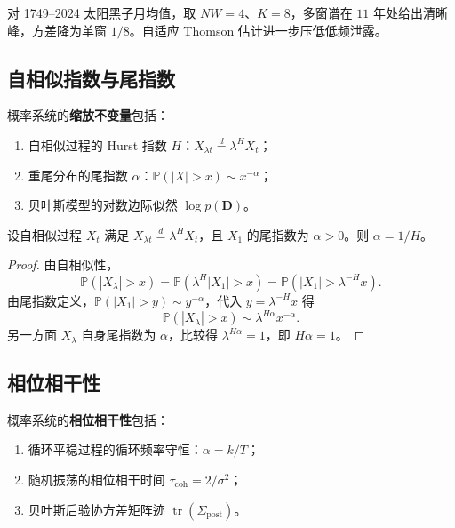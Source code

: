 \begin{example}[太阳黑子多窗谱]\label{ex:sunspot_multitaper}
对 1749--2024 太阳黑子月均值，取 $NW=4$、$K=8$，多窗谱在 $11$ 年处给出清晰峰，方差降为单窗 $1/8$。自适应 Thomson 估计进一步压低低频泄露。
\end{example}

\subsection{自相似指数与尾指数}

\begin{definition}[自相似指数与尾指数]\label{def:probability_scaling_charge}
概率系统的\textbf{缩放不变量}包括：
\begin{enumerate}[label=(\roman*)]
    \item 自相似过程的 Hurst 指数 $H$：$X_{\lambda t}\stackrel{d}{=}\lambda^H X_t$；
    \item 重尾分布的尾指数 $\alpha$：$\mathbb P(|X|>x)\sim x^{-\alpha}$；
    \item 贝叶斯模型的对数边际似然 $\log p(\mathbf D)$。
\end{enumerate}
\end{definition}

\begin{proposition}\label{prop:hurst_tail_duality}
设自相似过程 $X_t$ 满足 $X_{\lambda t}\stackrel{d}{=}\lambda^H X_t$，且 $X_1$ 的尾指数为 $\alpha>0$。则 $\alpha=1/H$。
\end{proposition}

\begin{proof}
由自相似性，
\[
\mathbb P(|X_\lambda|>x)=\mathbb P(\lambda^H|X_1|>x)=\mathbb P(|X_1|>\lambda^{-H}x).
\]
由尾指数定义，$\mathbb P(|X_1|>y)\sim y^{-\alpha}$，代入 $y=\lambda^{-H}x$ 得
\[
\mathbb P(|X_\lambda|>x)\sim \lambda^{H\alpha}x^{-\alpha}.
\]
另一方面 $X_\lambda$ 自身尾指数为 $\alpha$，比较得 $\lambda^{H\alpha}=1$，即 $H\alpha=1$。
\end{proof}

\subsection{相位相干性}

\begin{definition}[相位相干性]\label{def:probability_angular_momentum}
概率系统的\textbf{相位相干性}包括：
\begin{enumerate}[label=(\roman*)]
    \item 循环平稳过程的循环频率守恒：$\alpha=k/T$；
    \item 随机振荡的相位相干时间 $\tau_{\mathrm{coh}}=2/\sigma^2$；
    \item 贝叶斯后验协方差矩阵迹 $\operatorname{tr}(\Sigma_{\mathrm{post}})$。
\end{enumerate}
\end{definition}

